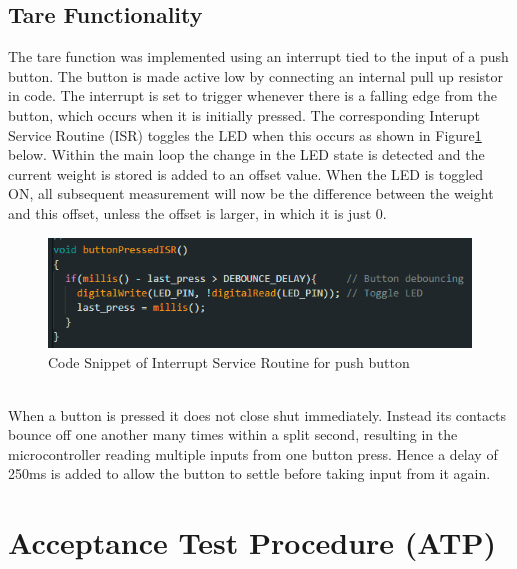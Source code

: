 \documentclass[class=report,11pt,crop=false]{standalone}
\begin{document}
	\subsection{Tare Functionality}
	The tare function was implemented using an interrupt tied to the input of a push button. The button is made active low by connecting an internal pull up resistor in code. The interrupt is set to trigger whenever there is a falling edge from the button, which occurs when it is initially pressed. The corresponding Interupt Service Routine (ISR) toggles the LED when this occurs as shown in Figure\ref{fig:S16} below. Within the main loop the change in the LED state is detected and the current weight is stored is added to an offset value. When the LED is toggled ON, all subsequent measurement will now be the difference between the weight and this offset, unless the offset is larger, in which it is just 0.
	\begin{figure}[h!]
		\centering
		\includegraphics[width=0.7\linewidth]{Figures/ButtonPressed.png}
		\caption{Code Snippet of Interrupt Service Routine for push button}
		\label{fig:S16}
	\end{figure}\\
	When a button is pressed it does not close shut immediately. Instead its contacts bounce off one another many times within a split second, resulting in the microcontroller reading multiple inputs from one button press. Hence a delay of 250ms is added to allow the button to settle before taking input from it again. 
	
	\section{Acceptance Test Procedure (ATP)}
\end{document}
